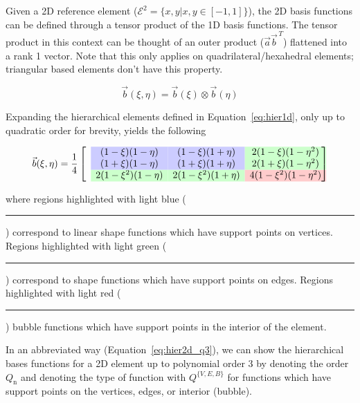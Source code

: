 \documentclass[11pt]{style/memo}
\begin{document}
Given a 2D reference element ($\mathcal{E}^2 = \{x,y|x,y\in \left[-1,1\right]\}$), the
2D basis functions can be defined through a tensor product of the 1D basis functions.
The tensor product in this context can be thought of an outer product ($\vec{a}\vec{b}^{\,T}$) flattened
into a rank 1 vector. Note that this only applies on quadrilateral/hexahedral elements;
triangular based elements don't have this property.

\begin{equation}
    \vec{b}(\xi,\eta) = \vec{b}(\xi) \otimes \vec{b}(\eta)
\end{equation}

Expanding the hierarchical elements defined in Equation~\ref{eq:hier1d}, only up to
quadratic order for brevity, yields the following

\begin{equation}
    \label{eq:hier2d}
    \vec{b}(\xi,\eta) = \frac{1}{4} \begin{bmatrix}
        & \cellcolor{blue!20!white} (1-\xi)(1-\eta)     & \cellcolor{blue!20!white} (1-\xi)(1+\eta)     & \cellcolor{green!20!white} 2(1-\xi)(1-\eta^2) \\
        & \cellcolor{blue!20!white} (1+\xi)(1-\eta)     & \cellcolor{blue!20!white} (1+\xi)(1+\eta)     & \cellcolor{green!20!white} 2(1+\xi)(1-\eta^2) \\
        & \cellcolor{green!20!white} 2(1-\xi^2)(1-\eta) & \cellcolor{green!20!white} 2(1-\xi^2)(1+\eta) & \cellcolor{red!20!white} 4(1-\xi^2)(1-\eta^2)
    \end{bmatrix}
\end{equation}

where regions highlighted with light blue ({\color{blue!20!white}\rule{1em}{1em}})
correspond to linear shape functions which have support points on vertices. Regions
highlighted with light green ({\color{green!20!white}\rule{1em}{1em}}) correspond
to shape functions which have support points on edges. Regions highlighted with light
red ({\color{red!20!white}\rule{1em}{1em}}) bubble functions which have support points
in the interior of the element.

In an abbreviated way (Equation~\ref{eq:hier2d_q3}), we can show the hierarchical bases
functions for a 2D element up to polynomial order 3 by denoting the order $Q_\mathrm{n}$
and denoting the type of function with $Q^{\{V,E,B\}}$ for functions which have support
points on the vertices, edges, or interior (bubble).
\end{document}
